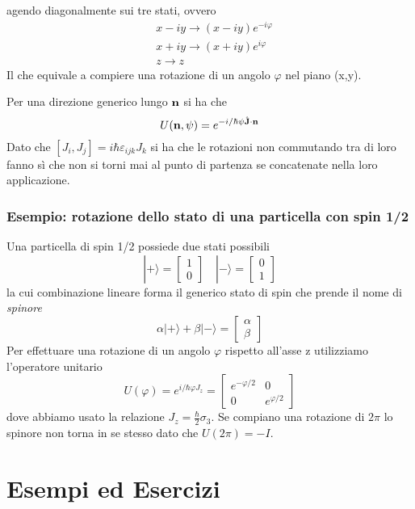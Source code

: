 agendo diagonalmente sui tre stati, ovvero
\begin{align*}
	& x-iy \to (x-iy)e^{-i \varphi} \\[0.3cm]
	& x+iy \to (x+iy)e^{i \varphi} \\[0.3cm]
	& z \to z
\end{align*}
Il che equivale a compiere una rotazione di un angolo $\varphi$ nel piano (x,y).

Per una direzione generico lungo $\bold{n}$ si ha che 
\begin{equation*}
	U(\bold{n},\psi) = e^{-i/\hbar \psi \hat{\bold{J}} \cdot \bold{n}} 
\end{equation*}
Dato che $[J_{i},J_{j}] = i \hbar \varepsilon_{ijk}J_{k}$ si ha che le rotazioni non commutando tra di loro fanno s\`i che non si torni mai al punto di partenza se concatenate nella loro applicazione.

\subsubsection{Esempio: rotazione dello stato di una particella con spin 1/2}

Una particella di spin 1/2 possiede due stati possibili 
\begin{equation*}
	|+ \rangle = \left[ \begin{array}{c}
		1 \\ 0
	\end{array}\right]
	\quad
	|- \rangle = \left[ \begin{array}{c}
		0 \\ 1
	\end{array}\right]
\end{equation*}
la cui combinazione lineare forma il generico stato di spin che prende il nome di \textit{spinore}
\begin{equation*}
	\alpha |+ \rangle + \beta |- \rangle = \left[ \begin{array}{c}
		\alpha \\ \beta
	\end{array}\right]
\end{equation*}
Per effettuare una rotazione di un angolo $\varphi$ rispetto all'asse z utilizziamo l'operatore unitario 
\begin{equation*}
	U(\varphi) = e^{i/\hbar \varphi J_{z}} = \left[ \begin{array}{cc}
		e^{-\varphi/2} & 0\\ 0 & e^{\varphi/2}
	\end{array}\right]
\end{equation*}
dove abbiamo usato la relazione $J_{z} = \frac{\hbar }{2} \sigma_3$. Se compiano una rotazione di $2 \pi$ lo spinore non torna in se stesso dato che $U(2\pi) = -I$. 

\newpage

\section{Esempi ed Esercizi}
